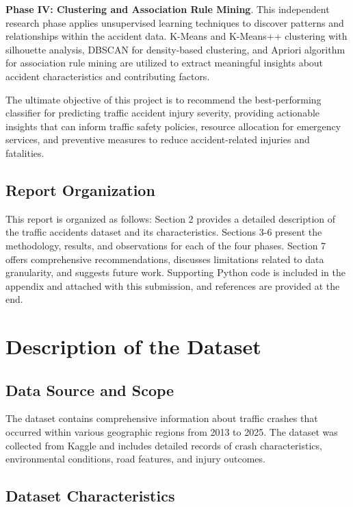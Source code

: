 \documentclass[stu,12pt,floatsintext]{apa7}
\begin{document}
\textbf{Phase IV: Clustering and Association Rule Mining}. This independent research phase applies unsupervised learning techniques to discover patterns and relationships 
within the accident data. K-Means and K-Means++ clustering with silhouette analysis, DBSCAN for density-based clustering, and Apriori algorithm for association rule mining 
are utilized to extract meaningful insights about accident characteristics and contributing factors.

The ultimate objective of this project is to recommend the best-performing classifier for predicting traffic accident injury severity, providing 
actionable insights that can inform traffic safety policies, resource allocation for emergency services, and preventive measures to reduce 
accident-related injuries and fatalities.

\subsection{Report Organization}
This report is organized as follows: Section 2 provides a detailed description of the traffic accidents dataset 
and its characteristics. Sections 3-6 present the methodology, results, and observations for each of the four phases. Section 
7 offers comprehensive recommendations, discusses limitations related to data granularity, and suggests future work. 
Supporting Python code is included in the appendix and attached with this submission, and references are provided at the end. 

\section{Description of the Dataset}

\subsection{Data Source and Scope}

The dataset contains comprehensive information about traffic crashes that occurred within various geographic regions from 2013 to 2025. The dataset 
was collected from Kaggle and includes detailed records of crash characteristics, environmental conditions, road features, and injury outcomes.

\subsection{Dataset Characteristics}
\end{document}
